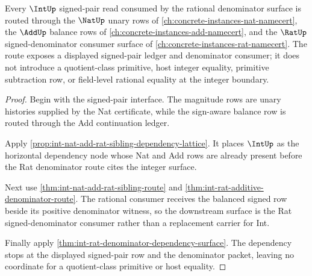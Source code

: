 \begin{theorem}
\label{thm:int-nat-add-rat-sibling-lattice-route}
Every $\IntUp$ signed-pair read consumed by the rational denominator surface is routed through the $\NatUp$ unary rows of \autoref{ch:concrete-instances-nat-namecert}, the $\AddUp$ balance rows of \autoref{ch:concrete-instances-add-namecert}, and the $\RatUp$ signed-denominator consumer surface of \autoref{ch:concrete-instances-rat-namecert}. The route exposes a displayed signed-pair ledger and denominator consumer; it does not introduce a quotient-class primitive, host integer equality, primitive subtraction row, or field-level rational equality at the integer boundary.
\end{theorem}
\begin{proof}
Begin with the signed-pair interface. The magnitude rows are unary histories supplied by the Nat certificate, while the sign-aware balance row is routed through the Add continuation ledger.

Apply \autoref{prop:int-nat-add-rat-sibling-dependency-lattice}. It places $\IntUp$ as the horizontal dependency node whose Nat and Add rows are already present before the Rat denominator route cites the integer surface.

Next use \autoref{thm:int-nat-add-rat-sibling-route} and \autoref{thm:int-rat-additive-denominator-route}. The rational consumer receives the balanced signed row beside its positive denominator witness, so the downstream surface is the Rat signed-denominator consumer rather than a replacement carrier for Int.

Finally apply \autoref{thm:int-rat-denominator-dependency-surface}. The dependency stops at the displayed signed-pair row and the denominator packet, leaving no coordinate for a quotient-class primitive or host equality.
\end{proof}
